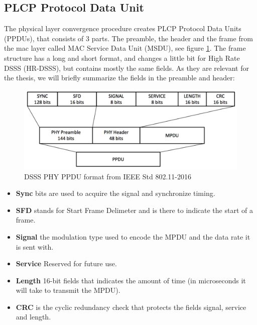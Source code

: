 	\subsection{PLCP Protocol Data Unit}
	The physical layer convergence procedure creates PLCP Protocol Data Units (PPDUs), 
	that consists of 3 parts. The preamble, the header and the frame from the mac layer
	called MAC Service Data Unit (MSDU), see figure \ref{fig:PPDU}. The frame structure
	has a long and short format, and changes a little bit for High Rate DSSS (HR-DSSS),
	but contains mostly the same fields. As they are relevant for the thesis,
	we will briefly summarize the fields in the preamble and header:

	\begin{figure}
	\center
	\includegraphics[scale=0.5]{Images/PPDU.png}
	\caption{DSSS PHY PPDU format from IEEE Std 802.11-2016  }
	\label{fig:PPDU}
	\end{figure}


	\begin{itemize}
	\item \textbf{Sync} bits are used to acquire the signal and synchronize timing. 
	\item \textbf{SFD} stands for Start Frame Delimeter and is there to indicate the start of a frame.  
	\item \textbf{Signal} the modulation type used to encode the MPDU and
	the data rate it is sent with. 
	\item \textbf{Service} Reserved for future use. 
	\item \textbf{Length} 16-bit fields that indicates the amount of time (in
			microseconds it will take to transmit the MPDU).
	\item \textbf{CRC} is the cyclic redundancy check that protects
	the fields signal, service and length. 
	\end{itemize}

